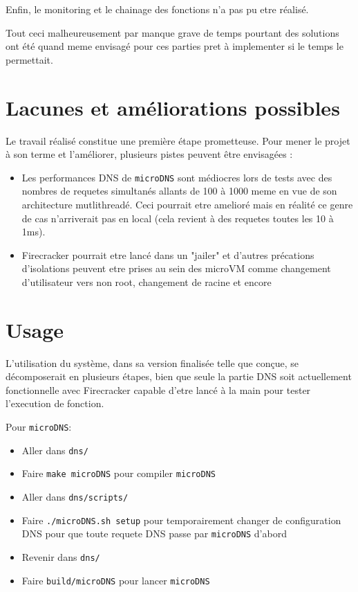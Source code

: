 \documentclass[12pt]{article}
\begin{document}
Enfin, le monitoring et le chainage des fonctions n'a pas pu etre réalisé.

Tout ceci malheureusement par manque grave de temps pourtant des solutions ont été quand meme envisagé pour ces parties pret à implementer si le temps le permettait.

\section{Lacunes et améliorations possibles}
Le travail réalisé constitue une première étape prometteuse. Pour mener le projet à son terme et l'améliorer, plusieurs pistes peuvent être envisagées :

\begin{itemize}
	\item Les performances DNS  de \texttt{microDNS} sont médiocres lors de tests avec des nombres de requetes simultanés allants de 100 à 1000 meme en vue de son architecture mutlithreadé. Ceci pourrait etre amelioré mais en réalité ce genre de cas n'arriverait pas en local (cela revient à des requetes toutes les 10 à 1ms).
	\item Firecracker pourrait etre lancé dans un "jailer" et d'autres précations d'isolations peuvent etre prises au sein des microVM comme changement d'utilisateur vers non root, changement de racine et encore
\end{itemize}

\section{Usage}
L'utilisation du système, dans sa version finalisée telle que conçue, se décomposerait en plusieurs étapes, bien que seule la partie DNS soit actuellement fonctionnelle avec Firecracker capable d'etre lancé à la main pour tester l'execution de fonction.

Pour \texttt{microDNS}:
\begin{itemize}
	\item Aller dans \texttt{dns/}
	\item Faire \lstinline|make microDNS| pour compiler \texttt{microDNS}
	\item Aller dans \texttt{dns/scripts/}
	\item Faire \lstinline|./microDNS.sh setup| pour temporairement changer de configuration DNS pour que toute requete DNS passe par \texttt{microDNS} d'abord
	\item Revenir dans \texttt{dns/}
	\item Faire \lstinline|build/microDNS| pour lancer \texttt{microDNS}
\end{itemize}
\end{document}
